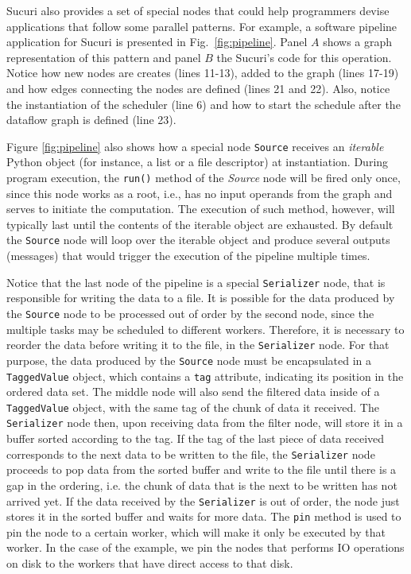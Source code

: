 Sucuri also provides a set of special nodes that could help programmers devise applications that follow some parallel patterns. For example, a software pipeline application for Sucuri is presented in Fig.~\ref{fig:pipeline}. Panel $A$ shows a graph representation of this pattern and panel $B$ the Sucuri's code for this operation. Notice how new nodes are creates (lines 11-13), added to the graph (lines 17-19) and how edges connecting the nodes are defined (lines 21 and 22). Also, notice the instantiation of the scheduler (line 6) and how to start the schedule after the dataflow graph is defined (line 23).

Figure \ref{fig:pipeline} also shows how a special node \texttt{Source} receives an \emph{iterable} Python object (for instance, a list or a file descriptor) at instantiation. During program execution, the \texttt{run()} method of the \emph{Source} node will be fired only once, since this node works as a root, i.e., has no input operands from the graph and serves to initiate the computation. The execution of such method, however, will typically last until the contents of the iterable object are exhausted. By default the \texttt{Source} node will loop over the iterable object and produce several outputs (messages) that would trigger the execution of the pipeline multiple times. 

Notice that the last node of the pipeline is a special \texttt{Serializer} node, that is responsible for writing the data to a file. It is possible for the data produced by the \texttt{Source} node to be processed out of order by the second node, since the multiple tasks may be scheduled to different workers. Therefore, it is necessary to reorder the data before writing it to the file, in the \texttt{Serializer} node. For that purpose, the data produced by the \texttt{Source} node must be encapsulated in a \texttt{TaggedValue} object, which contains a \texttt{tag} attribute, indicating its position in the ordered data set. The middle node will also send the filtered data inside of a \texttt{TaggedValue} object, with the same tag of the chunk of data it received. The \texttt{Serializer} node then, upon receiving data from the filter node, will store it in a buffer sorted according to the tag. If the tag of the last piece of data received corresponds to the next data to be written to the file, the \texttt{Serializer} node proceeds to pop data from the sorted buffer and write to the file until there is a gap in the ordering, i.e. the chunk of data that is the next to be written has not arrived yet. If the data received by the \texttt{Serializer} is out of order, the node just stores it in the sorted buffer and waits for more data. The \texttt{pin\(\)} method is used to pin the node to a certain worker, which will make it only be executed by that worker. In the case of the example, we pin the nodes that performs I\/O operations on disk to the workers that have direct access to that disk. 

